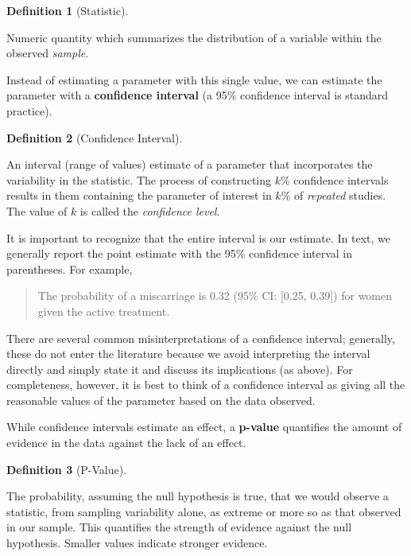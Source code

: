 \documentclass[
  letterpaper,
  DIV=11,
  numbers=noendperiod]{scrreprt}
\theoremstyle{definition}
\newtheorem{definition}{Definition}[chapter]
\theoremstyle{definition}
\theoremstyle{remark}
\begin{document}
\begin{definition}[Statistic]\protect\hypertarget{def-statistic}{}\label{def-statistic}

Numeric quantity which summarizes the distribution of a variable within
the observed \emph{sample}.

\end{definition}

Instead of estimating a parameter with this single value, we can
estimate the parameter with a \textbf{confidence interval} (a 95\%
confidence interval is standard practice).

\begin{definition}[Confidence
Interval]\protect\hypertarget{def-confidence-interval}{}\label{def-confidence-interval}

An interval (range of values) estimate of a parameter that incorporates
the variability in the statistic. The process of constructing \(k\)\%
confidence intervals results in them containing the parameter of
interest in \(k\)\% of \emph{repeated} studies. The value of \(k\) is
called the \emph{confidence level}.

\end{definition}

It is important to recognize that the entire interval is our estimate.
In text, we generally report the point estimate with the 95\% confidence
interval in parentheses. For example,

\begin{quote}
The probability of a miscarriage is 0.32 (95\% CI: {[}0.25, 0.39{]}) for
women given the active treatment.
\end{quote}

There are several common misinterpretations of a confidence interval;
generally, these do not enter the literature because we avoid
interpreting the interval directly and simply state it and discuss its
implications (as above). For completeness, however, it is best to think
of a confidence interval as giving all the reasonable values of the
parameter based on the data observed.

While confidence intervals estimate an effect, a \textbf{p-value}
quantifies the amount of evidence in the data against the lack of an
effect.

\begin{definition}[P-Value]\protect\hypertarget{def-pvalue}{}\label{def-pvalue}

The probability, assuming the null hypothesis is true, that we would
observe a statistic, from sampling variability alone, as extreme or more
so as that observed in our sample. This quantifies the strength of
evidence against the null hypothesis. Smaller values indicate stronger
evidence.

\end{definition}
\end{document}
